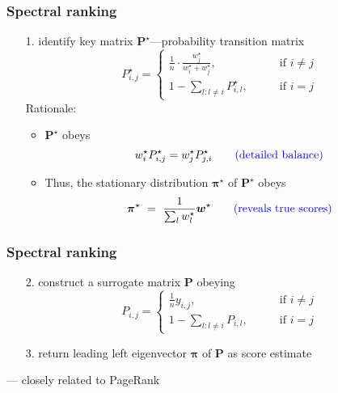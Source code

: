 \documentclass[compress,
mathserif,wide,%
]{beamer}
\begin{document}
\begin{frame}
	\frametitle{Spectral ranking}



	\begin{itemize}
		\item[{\color{black}1.}] identify key matrix  ${\bm{P}}^{\star}$---\alert{probability transition matrix}
		\[
			{P}^{\star}_{i,j}=\begin{cases}
			\frac{1}{n}\cdot\frac{w_j^{\star}}{w_i^{\star}+w_j^{\star}}, & \text{if }i\neq j\\
			1-\sum\nolimits _{l:l\neq i} {P}^{\star}_{i,l},\qquad & \text{if }i=j
			\end{cases}
		\]
		Rationale:
		\begin{itemize}
		\item  $\bm{P}^{\star}$ obeys
		\[
			w_i^{\star} P_{i,j}^{\star} = w_j^{\star} P_{j,i}^{\star} \qquad \textcolor{blue}{ \text{(detailed balance)}}
		\]
		\item Thus, the stationary distribution $\bm{\pi}^{\star}$ of $\bm{P}^{\star}$ obeys
		\[
			\bm{\pi}^{\star}  ~=~ \frac{1}{\sum_{l}w_l^{\star}} \bm{w}^{\star} \qquad \textcolor{blue}{ (\text{reveals true scores})}
		\]


	\end{itemize}

	\end{itemize}



\end{frame}



\begin{frame}
	\frametitle{Spectral ranking}
	\begin{itemize}
		
		\item[{\color{black}2.}] construct a surrogate matrix ${\bm{P}}$ obeying
		\[
			{P}_{i,j}=\begin{cases}
			\frac{1}{n}y_{i,j}, & \text{if }i\neq j\\
			1-\sum\nolimits _{l:l\neq i} {P}_{i,l},\qquad & \text{if }i=j
			\end{cases}
		\]
		\bigskip

		\item[{\color{black}3.}] return leading left eigenvector ${\bm{\pi}}$ of ${\bm{P}}$ as score estimate
	
	\end{itemize}


	\vfill

	\hfill --- closely related to PageRank

\end{frame}
\end{document}
